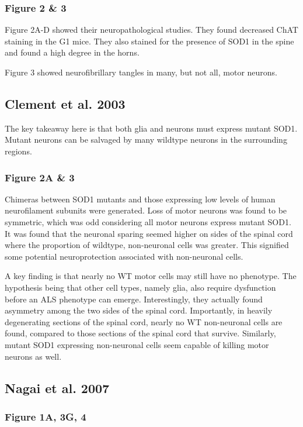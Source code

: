 \subsubsection*{Figure 2 \& 3} 
Figure 2A-D showed their neuropathological studies. They found decreased ChAT staining in the G1 mice. They also stained for the presence of SOD1 in the spine and found a high degree in the horns. 

Figure 3 showed neurofibrillary tangles in many, but not all, motor neurons. 


\subsection*{Clement et al. 2003}

The key takeaway here is that both glia and neurons must express mutant SOD1. Mutant neurons can be salvaged by many wildtype neurons in the surrounding regions. 

\subsubsection*{Figure 2A \& 3}
Chimeras between SOD1 mutants and those expressing low levels of human neurofilament subunits were generated. Loss of motor neurons was found to be symmetric, which was odd considering all motor neurons express mutant SOD1. It was found that the neuronal sparing seemed higher on sides of the spinal cord where the proportion of wildtype, non-neuronal cells was greater. This signified some potential neuroprotection associated with non-neuronal cells.\newline

A key finding is that nearly no WT motor cells may still have no phenotype. The hypothesis being that other cell types, namely glia, also require dysfunction before an ALS phenotype can emerge. Interestingly, they actually found asymmetry among the two sides of the spinal cord. Importantly, in heavily degenerating sections of the spinal cord, nearly no WT non-neuronal cells are found, compared to those sections of the spinal cord that survive. Similarly, mutant SOD1 expressing non-neuronal cells seem capable of killing motor neurons as well. 


\subsection*{Nagai et al. 2007}

\subsubsection*{Figure 1A, 3G, 4}

